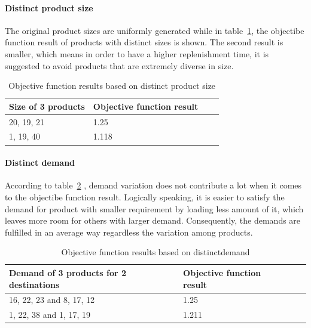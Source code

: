 \documentclass{article}
\begin{document}
\paragraph{Distinct product size}
The original product sizes are uniformly generated while in table~\ref{tab:size variation}, the objectibe function result of products with distinct sizes is shown. The second result is smaller, which means in order to have a higher replenishment time, it is suggested to avoid products that are extremely diverse in size.

\begin{table}[ht]
 \caption{Objective function results based on distinct product size}
  \centering
  \begin{tabular}{llll}
    \toprule
    Size of 3 products   & Objective function result \\
    \midrule
    20, 19, 21	&	1.25	\\
    1, 19, 40	&	1.118	\\
    \bottomrule
  \end{tabular}
  \label{tab:size variation}
\end{table}

\paragraph{Distinct demand}
According to table~\ref{tab:demand variation} , demand variation does not contribute a lot when it comes to the objectibe function result. Logically speaking, it is easier to satisfy the demand for product with smaller requirement by loading less amount of it, which leaves more room for others with larger demand. Consequently, the demands are fulfilled in an average way regardless the variation among products.

\begin{table}[ht]
 \caption{Objective function results based on distinctdemand}
  \centering
  \begin{tabular}{llll}
    \toprule
    Demand of 3 products for 2 destinations   & Objective function result \\
    \midrule
    16, 22, 23 and 8, 17, 12	&	1.25	\\
    1, 22, 38 and 1, 17, 19	&	1.211	\\
    \bottomrule
  \end{tabular}
  \label{tab:demand variation}
\end{table}
\end{document}

